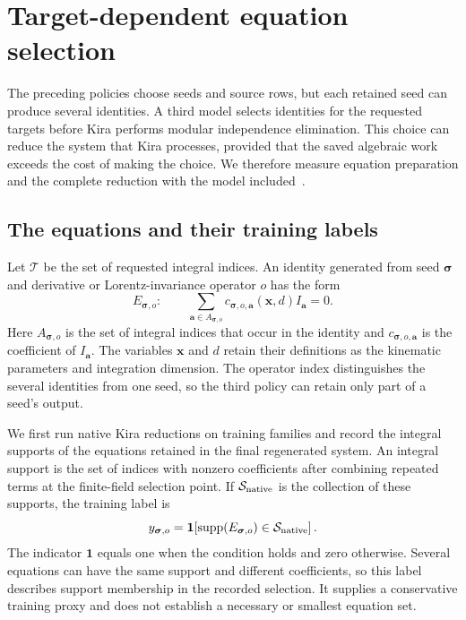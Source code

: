 \clearpage
\section{Target-dependent equation selection}
\label{sec:equation-selection}
The preceding policies choose seeds and source rows, but each retained seed
can produce several identities. A third model selects identities for the
requested targets before Kira performs modular independence elimination.
This choice can reduce the system that Kira processes, provided that the
saved algebraic work exceeds the cost of making the choice. We therefore
measure equation preparation and the complete reduction with the model
included~\cite{Kira3,KiraEquationSelectionData}.

\subsection{The equations and their training labels}
Let $\mathcal T$ be the set of requested integral indices. An identity
generated from seed $\boldsymbol\sigma$ and derivative or
Lorentz-invariance operator $o$ has the form
\begin{equation}
 E_{\boldsymbol\sigma,o}:\qquad
 \sum_{\boldsymbol a\in A_{\boldsymbol\sigma,o}}
 c_{\boldsymbol\sigma,o,\boldsymbol a}(\boldsymbol x,d)
 I_{\boldsymbol a}=0 .
 \label{eq:equation-selection-identity}
\end{equation}
Here $A_{\boldsymbol\sigma,o}$ is the set of integral indices that occur
in the identity and $c_{\boldsymbol\sigma,o,\boldsymbol a}$ is the
coefficient of $I_{\boldsymbol a}$. The variables $\boldsymbol x$ and
$d$ retain their definitions as the kinematic parameters and integration
dimension. The operator index distinguishes the several identities from
one seed, so the third policy can retain only part of a seed's output.

We first run native Kira reductions on training families and record the
integral supports of the equations retained in the final regenerated
system. An integral support is the set of indices with nonzero
coefficients after combining repeated terms at the finite-field selection
point. If $\mathcal S_{\rm native}$ is the collection of these supports,
the training label is
\begin{equation}
 y_{\boldsymbol\sigma,o}
 =\mathbf 1\!\left[
  \operatorname{supp}(E_{\boldsymbol\sigma,o})
  \in\mathcal S_{\rm native}\right].
 \label{eq:equation-selection-label}
\end{equation}
The indicator $\mathbf 1$ equals one when the condition holds and zero
otherwise. Several equations can have the same support and different
coefficients, so this label describes support membership in the recorded
selection. It supplies a conservative training proxy and does not establish
a necessary or smallest equation set.

